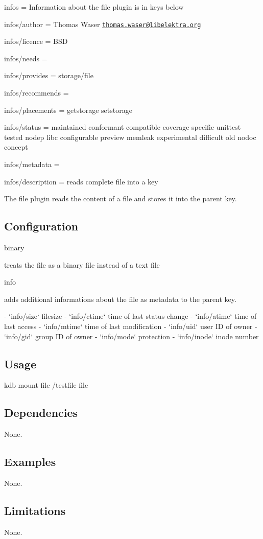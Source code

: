 
\begin{DoxyItemize}
\item infos = Information about the file plugin is in keys below
\item infos/author = Thomas Waser \href{mailto:thomas.waser@libelektra.org}{\tt thomas.\+waser@libelektra.\+org}
\item infos/licence = B\+SD
\item infos/needs =
\item infos/provides = storage/file
\item infos/recommends =
\item infos/placements = getstorage setstorage
\item infos/status = maintained conformant compatible coverage specific unittest tested nodep libc configurable preview memleak experimental difficult old nodoc concept
\item infos/metadata =
\item infos/description = reads complete file into a key
\end{DoxyItemize}

The file plugin reads the content of a file and stores it into the parent key.

\subsection*{Configuration}


\begin{DoxyItemize}
\item {\ttfamily binary} \begin{DoxyVerb}  treats the file as a binary file instead of a text file
\end{DoxyVerb}

\item {\ttfamily info} \begin{DoxyVerb}  adds additional informations about the file as metadata to the parent key.

  - `info/size` filesize
  - `info/ctime` time of last status change
  - `info/atime` time of last access
  - `info/mtime` time of last modification
  - `info/uid` user ID of owner
  - `info/gid` group ID of owner
  - `info/mode` protection
  - `info/inode` inode number
\end{DoxyVerb}

\end{DoxyItemize}

\subsection*{Usage}

{\ttfamily kdb mount file /testfile file}

\subsection*{Dependencies}

None.

\subsection*{Examples}

None.

\subsection*{Limitations}

None. 